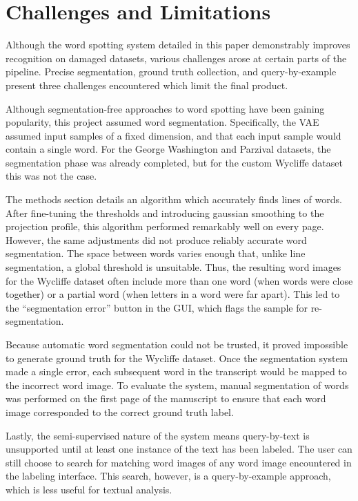 \documentclass[final]{ukthesis}
\begin{document}
\section{Challenges and Limitations}
\label{sec:challenges}
Although the word spotting system detailed in this paper demonstrably improves recognition on damaged datasets, various challenges arose at certain parts of the pipeline. Precise segmentation, ground truth collection, and query-by-example present three challenges encountered which limit the final product.

Although segmentation-free approaches to word spotting have been gaining popularity, this project assumed word segmentation. Specifically, the VAE assumed input samples of a fixed dimension, and that each input sample would contain a single word. For the George Washington and Parzival datasets, the segmentation phase was already completed, but for the custom Wycliffe dataset this was not the case.

The methods section details an algorithm which accurately finds lines of words. After fine-tuning the thresholds and introducing gaussian smoothing to the projection profile, this algorithm performed remarkably well on every page. However, the same adjustments did not produce reliably accurate word segmentation. The space between words varies enough that, unlike line segmentation, a global threshold is unsuitable. Thus, the resulting word images for the Wycliffe dataset often include more than one word (when words were close together) or a partial word (when letters in a word were far apart). This led to the ``segmentation error'' button in the GUI, which flags the sample for re-segmentation.

Because automatic word segmentation could not be trusted, it proved impossible to generate ground truth for the Wycliffe dataset. Once the segmentation system made a single error, each subsequent word in the transcript would be mapped to the incorrect word image. To evaluate the system, manual segmentation of words was performed on the first page of the manuscript to ensure that each word image corresponded to the correct ground truth label.

Lastly, the semi-supervised nature of the system means query-by-text is unsupported until at least one instance of the text has been labeled. The user can still choose to search for matching word images of any word image encountered in the labeling interface. This search, however, is a query-by-example approach, which is less useful for textual analysis.
\end{document}
